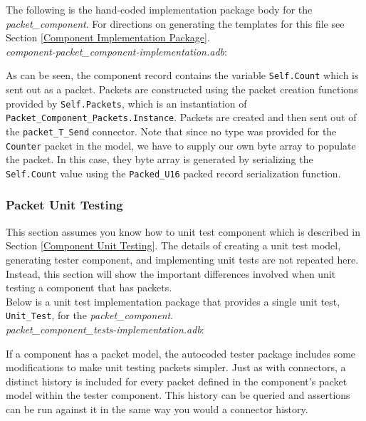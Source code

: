 The following is the hand-coded implementation package body for the \textit{packet\_component}. For directions on generating the templates for this file see Section \ref{Component Implementation Package}. \\

\textit{component-packet\_component-implementation.adb}:

As can be seen, the component record contains the variable \texttt{Self.Count} which is sent out as a packet. Packets are constructed using the packet creation functions provided by \texttt{Self.Packets}, which is an instantiation of \texttt{Packet\_Component\_Packets.Instance}. Packets are created and then sent out of the \texttt{packet\_T\_Send} connector. Note that since no type was provided for the \texttt{Counter} packet in the model, we have to supply our own byte array to populate the packet. In this case, they byte array is generated by serializing the \texttt{Self.Count} value using the \texttt{Packed\_U16} packed record serialization function.

\subsubsection{Packet Unit Testing}

This section assumes you know how to unit test component which is described in Section \ref{Component Unit Testing}. The details of creating a unit test model, generating tester component, and implementing unit tests are not repeated here. Instead, this section will show the important differences involved when unit testing a component that has packets. \\

Below is a unit test implementation package that provides a single unit test, \texttt{Unit\_Test}, for the \textit{packet\_component}. \\

\textit{packet\_component\_tests-implementation.adb}:

If a component has a packet model, the autocoded tester package includes some modifications to make unit testing packets simpler. Just as with connectors, a distinct history is included for every packet defined in the component's packet model within the tester component. This history can be queried and assertions can be run against it in the same way you would a connector history. \\

